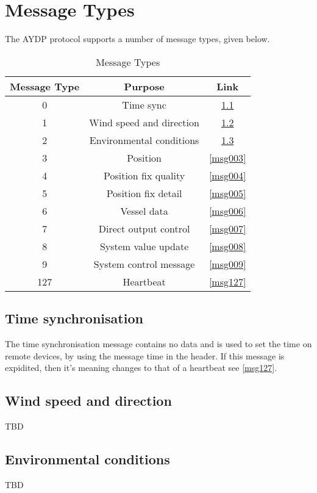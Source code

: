\chapter{Message Types}
The AYDP protocol supports a number of message types, given below.

\begin{table}[H]
  \centering
  \begin{tabular}{ c c c }
  Message Type & Purpose & Link\\
\hline
   0 & Time sync                & \ref{msg000} \\
   1 & Wind speed and direction & \ref{msg001} \\
   2 & Environmental conditions & \ref{msg002} \\
   3 & Position                 & \ref{msg003} \\
   4 & Position fix quality     & \ref{msg004} \\
   5 & Position fix detail      & \ref{msg005} \\
   6 & Vessel data              & \ref{msg006} \\
   7 & Direct output control    & \ref{msg007} \\
   8 & System value update      & \ref{msg008} \\
   9 & System control message   & \ref{msg009} \\
 127 & Heartbeat                & \ref{msg127} \\
  \end{tabular}
  \caption{Message Types}
  \label{table:msg:types}
\end{table}

\section{Time synchronisation}
\label{msg000}
The time synchronisation message contains no data and is used to set the time on remote devices, by using the message time in the header. If this message is expidited, then it's meaning changes to that of a heartbeat see \ref{msg127}.

\section{Wind speed and direction}
\label{msg001}
TBD

\section{Environmental conditions}
\label{msg002}
TBD

